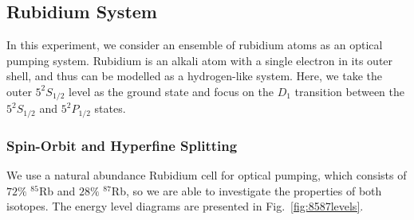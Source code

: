 \subsection{Rubidium System}

In this experiment, we consider an ensemble of rubidium atoms as an
optical pumping system. Rubidium is an alkali atom with a single
electron in its outer shell, and thus can be modelled as a
hydrogen-like system. Here, we take the outer $5^2S_{1/2}$ level as
the ground state and focus on the $D_1$ transition between the
$5^2S_{1/2}$ and $5^2P_{1/2}$ states. 

\subsubsection{Spin-Orbit and Hyperfine Splitting}
We use a natural abundance Rubidium cell for optical pumping, which
consists of $72\%$ $^{85}$Rb and $28\%$ $^{87}$Rb, so we are able to
investigate the properties of both isotopes. The energy level diagrams
are presented in Fig.~\ref{fig:8587levels}.


